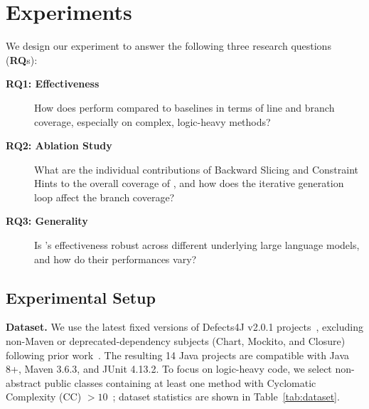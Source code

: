 \section{Experiments}



We design our experiment to answer the following three research questions (\textbf{RQ}s):

\begin{description}
\item[\textbf{RQ1: Effectiveness}] 
How does \ourmethod{} perform compared to baselines in terms of line and branch coverage, especially on complex, logic-heavy methods?

\item[\textbf{RQ2: Ablation Study}]
What are the individual contributions of Backward Slicing and Constraint Hints to the overall coverage of \ourmethod{}, and how does the iterative generation loop affect the branch coverage?

\item[\textbf{RQ3: Generality}]
Is \ourmethod{}'s effectiveness robust across different underlying large language models, and how do their performances vary?
\end{description}

\subsection{Experimental Setup}



\textbf{Dataset.} We use the latest fixed versions of Defects4J v2.0.1 projects~\cite{defects4j}, excluding non-Maven or deprecated-dependency subjects (Chart, Mockito, and Closure) following prior work~\cite{gu2025a}. The resulting 14 Java projects are compatible with Java 8+, Maven 3.6.3, and JUnit 4.13.2. To focus on logic-heavy code, we select non-abstract public classes containing at least one method with Cyclomatic Complexity (CC) $> 10$~\cite{mccabe1976complexity}; dataset statistics are shown in Table~\ref{tab:dataset}.



